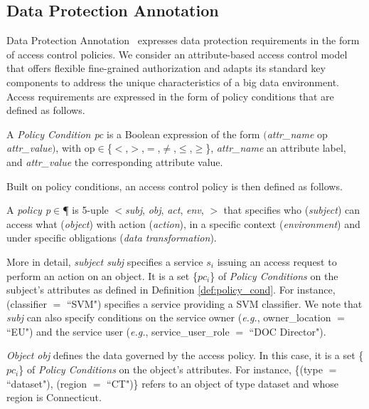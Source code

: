       \subsection{Data Protection Annotation}\label{sec:nonfuncannotation}
      Data Protection Annotation \myLambda\ expresses data protection requirements in the form of access control policies. We consider an attribute-based access control model that offers flexible fine-grained authorization and adapts its standard key components to address the unique characteristics of a big data environment. Access requirements are expressed in the form of policy conditions that are defined as follows.
      \vspace{0.5em}
      \begin{definition}\label{def:policy_cond}
        A \emph{Policy Condition pc} is a Boolean expression of the form $($\emph{attr\_name} op \emph{attr\_value}$)$, with op$\in$\{$<$,$>$,$=$,$\neq$,$\leq$,$\geq$\}, \emph{attr\_name} an attribute label, and \emph{attr\_value} the corresponding attribute value.
      \end{definition}
      \vspace{0.5em}
      Built on policy conditions, an access control policy is then defined as follows.
      \vspace{0.5em}
      \begin{definition}[Policy]\label{def:policy_rule}
        A {\it policy p}$\in$\P{} is 5-uple $<$\textit{subj}, \textit{obj}, \textit{act}, \textit{env}, \textit{\TP}$>$ that specifies who (\emph{subject}) can access what (\emph{object}) with action (\emph{action}), in a specific context (\emph{environment}) and under specific obligations (\emph{data transformation}).
      \end{definition}
      \vspace{0.5em}
      More in detail, \textit{subject subj} specifies a service $s_i$ issuing an access request to perform an action on an object. It is a set \{$pc_i$\} of \emph{Policy Conditions} on the subject's attributes as defined in Definition \ref{def:policy_cond}. For instance, (classifier $=$ ``SVM") specifies a service providing a SVM classifier. We note that \textit{subj} can also specify conditions on the service owner (\textit{e.g.}, owner\_location $=$ ``EU") and the service user (\textit{e.g.}, service\_user\_role $=$  ``DOC Director").

      \textit{Object obj} defines the data governed by the access policy. In this case, it is a set \{$pc_i$\} of \emph{Policy Conditions} on the object's attributes. %
      For instance, \{(type $=$  ``dataset"), (region $=$  ``CT")\} refers to an object of type dataset and whose region is Connecticut.

